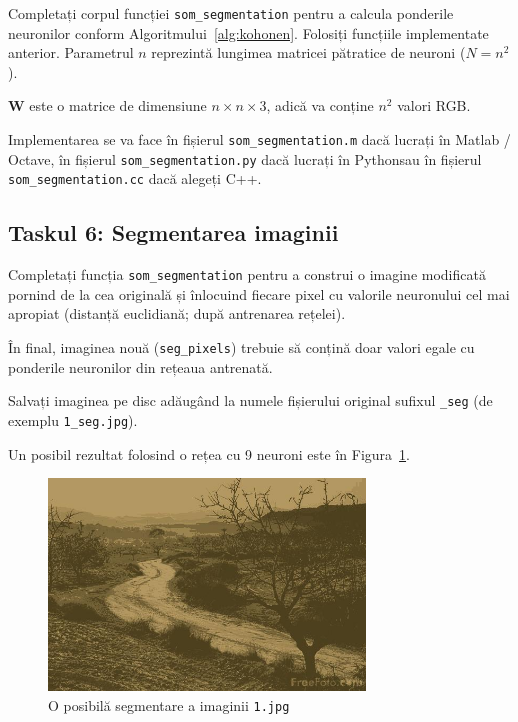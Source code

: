 \documentclass[12pt]{article}%
\newcommand{\mat}{{\color{brightmaroon} Matlab / Octave}}
\newcommand{\pyt}{{\color{cadmiumgreen} Python}}
\newcommand{\cc}{{\color{cobalt} C++}}
\begin{document}
Completați corpul funcției \texttt{som\_segmentation} pentru a calcula
ponderile neuronilor conform Algoritmului~\ref{alg:kohonen}. Folosiți
funcțiile implementate anterior. Parametrul $n$ reprezintă lungimea
matricei pătratice de neuroni ($N = n^2$).

$\mathbf{W}$ este o matrice de dimensiune $n \times n \times 3$, adică
va conține $n^2$ valori RGB.

Implementarea se va face în fișierul \texttt{som\_segmentation.m} dacă lucrați în
\mat, în fișierul \texttt{som\_segmentation.py} dacă lucrați în \pyt sau în fișierul \texttt{som\_segmentation.cc} dacă alegeți \cc.

\subsection{Taskul 6: Segmentarea imaginii}
\label{sec:task6}

Completați funcția \texttt{som\_segmentation} pentru a
construi o imagine modificată pornind de la cea originală și înlocuind
fiecare pixel cu valorile neuronului cel mai apropiat (distanță
euclidiană; după antrenarea rețelei).

În final, imaginea nouă (\texttt{seg\_pixels}) trebuie să conțină doar
valori egale cu ponderile neuronilor din rețeaua antrenată.

Salvați imaginea pe disc adăugând la numele fișierului original
sufixul \texttt{\_seg} (de exemplu \texttt{1\_seg.jpg}).

Un posibil rezultat folosind o rețea cu 9 neuroni este în
Figura~\ref{fig:seg}.

\begin{figure}[h]
  \centering
  \includegraphics[width=0.75\textwidth]{src/imgs/1_seg.jpg}
  \caption{O posibilă segmentare a imaginii \texttt{1.jpg}}
  \label{fig:seg}
\end{figure}
\end{document}
